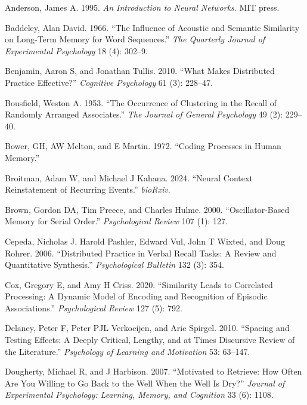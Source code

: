 \documentclass[
  letterpaper,
  11pt,
  english,
  singlespacing,
  headsepline]{MastersDoctoralThesis}
\newlength{\cslhangindent}
\newenvironment{CSLReferences}[2] %
 {\begin{list}{}{%
  \setlength{\itemindent}{0pt}
  \setlength{\leftmargin}{0pt}
  \setlength{\parsep}{0pt}
  \ifodd #1
   \setlength{\leftmargin}{\cslhangindent}
   \setlength{\itemindent}{-1\cslhangindent}
  \fi
  \setlength{\itemsep}{#2\baselineskip}}}
 {\end{list}}
\begin{document}
\label{refs}
\begin{CSLReferences}{1}{0}
Anderson, James A. 1995. \emph{An Introduction to Neural Networks}. MIT
press.

Baddeley, Alan David. 1966. {``The Influence of Acoustic and Semantic
Similarity on Long-Term Memory for Word Sequences.''} \emph{The
Quarterly Journal of Experimental Psychology} 18 (4): 302--9.

Benjamin, Aaron S, and Jonathan Tullis. 2010. {``What Makes Distributed
Practice Effective?''} \emph{Cognitive Psychology} 61 (3): 228--47.

Bousfield, Weston A. 1953. {``The Occurrence of Clustering in the Recall
of Randomly Arranged Associates.''} \emph{The Journal of General
Psychology} 49 (2): 229--40.

Bower, GH, AW Melton, and E Martin. 1972. {``Coding Processes in Human
Memory.''}

Broitman, Adam W, and Michael J Kahana. 2024. {``Neural Context
Reinstatement of Recurring Events.''} \emph{bioRxiv}.

Brown, Gordon DA, Tim Preece, and Charles Hulme. 2000.
{``Oscillator-Based Memory for Serial Order.''} \emph{Psychological
Review} 107 (1): 127.

Cepeda, Nicholas J, Harold Pashler, Edward Vul, John T Wixted, and Doug
Rohrer. 2006. {``Distributed Practice in Verbal Recall Tasks: A Review
and Quantitative Synthesis.''} \emph{Psychological Bulletin} 132 (3):
354.

Cox, Gregory E, and Amy H Criss. 2020. {``Similarity Leads to Correlated
Processing: A Dynamic Model of Encoding and Recognition of Episodic
Associations.''} \emph{Psychological Review} 127 (5): 792.

Delaney, Peter F, Peter PJL Verkoeijen, and Arie Spirgel. 2010.
{``Spacing and Testing Effects: A Deeply Critical, Lengthy, and at Times
Discursive Review of the Literature.''} \emph{Psychology of Learning and
Motivation} 53: 63--147.

Dougherty, Michael R, and J Harbison. 2007. {``Motivated to Retrieve:
How Often Are You Willing to Go Back to the Well When the Well Is
Dry?''} \emph{Journal of Experimental Psychology: Learning, Memory, and
Cognition} 33 (6): 1108.


\end{CSLReferences}
\end{document}
